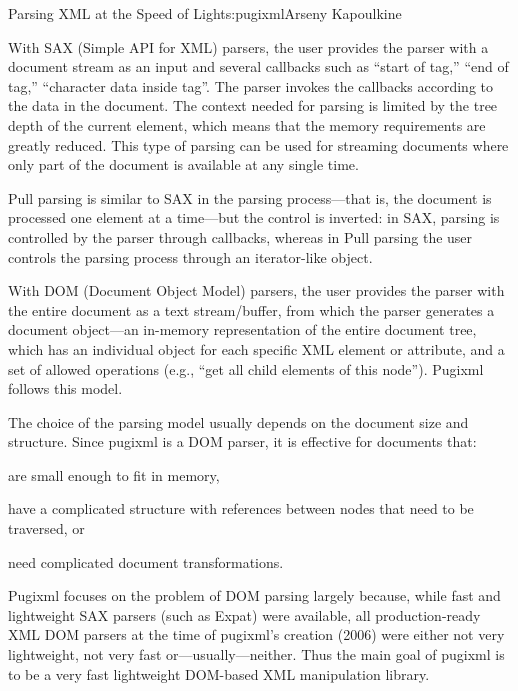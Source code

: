 \begin{aosachapter}{Parsing XML at the Speed of Light}{s:pugixml}{Arseny Kapoulkine}
\begin{aosaitemize}
\item
  With SAX (Simple API for XML) parsers, the user provides the parser
  with a document stream as an input and several callbacks such as
  ``start of tag,'' ``end of tag,'' ``character data inside tag''. The
  parser invokes the callbacks according to the data in the document.
  The context needed for parsing is limited by the tree depth of the
  current element, which means that the memory requirements are greatly
  reduced. This type of parsing can be used for streaming documents
  where only part of the document is available at any single time.
\item
  Pull parsing is similar to SAX in the parsing process---that is, the
  document is processed one element at a time---but the control is
  inverted: in SAX, parsing is controlled by the parser through
  callbacks, whereas in Pull parsing the user controls the parsing
  process through an iterator-like object.
\item
  With DOM (Document Object Model) parsers, the user provides the parser
  with the entire document as a text stream/buffer, from which the
  parser generates a document object---an in-memory representation of
  the entire document tree, which has an individual object for each
  specific XML element or attribute, and a set of allowed operations
  (e.g., ``get all child elements of this node''). Pugixml follows this
  model.
\end{aosaitemize}

The choice of the parsing model usually depends on the document size and
structure. Since pugixml is a DOM parser, it is effective for documents
that:

\begin{aosaitemize}

\item
  are small enough to fit in memory,
\item
  have a complicated structure with references between nodes that need
  to be traversed, or
\item
  need complicated document transformations.
\end{aosaitemize}


Pugixml focuses on the problem of DOM parsing largely because, while
fast and lightweight SAX parsers (such as Expat) were available, all
production-ready XML DOM parsers at the time of pugixml's creation
(2006) were either not very lightweight, not very fast
or---usually---neither. Thus the main goal of pugixml is to be a very
fast lightweight DOM-based XML manipulation library.


\end{aosachapter}
